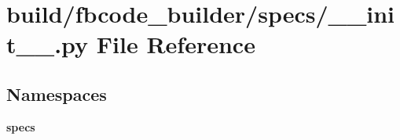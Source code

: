 \section{build/fbcode\+\_\+builder/specs/\+\_\+\+\_\+init\+\_\+\+\_\+.py File Reference}
\label{____init_____8py}
\subsection*{Namespaces}
\begin{DoxyCompactItemize}
\item 
 {\bf specs}
\end{DoxyCompactItemize}
